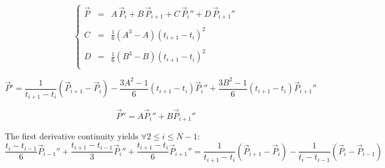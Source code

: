 \documentclass[aps,12pt]{revtex4}
\begin{document}
\begin{equation}
\left\lbrace
\begin{array}{rcl}
	\vec{P}   & = & A \, \vec{P}_i + B \, \vec{P}_{i+1} + C \, \vec{P}_i'' + D \, \vec{P}_{i+1}''\\
	\\
	C & = & \frac{1}{6} \left(A^3 - A\right) (t_{i+1}-t_i)^2\\
	\\
	D & = & \frac{1}{6} \left(B^3 - B\right) (t_{i+1}-t_i)^2\\
\end{array}
\right.
\end{equation}

\begin{equation}
	\vec{P}' = \dfrac{1}{t_{i+1}-t_i} \left(\vec{P}_{i+1}-\vec{P}_i\right) 
	- \dfrac{3A^2-1}{6} (t_{i+1}-t_i) \vec{P}_i''
	+ \dfrac{3B^2-1}{6} (t_{i+1}-t_i) \vec{P}_{i+1}''
\end{equation}	


\begin{equation}
	\vec{P}'' = A \vec{P}_i'' + B \vec{P}_{i+1}''
\end{equation}

The first derivative continuity yields $\forall 2\leq i \leq N-1$:
\begin{equation}
 	\dfrac{t_{i}-t_{i-1}}{6} \vec{P}_{i-1}'' + 
	\dfrac{t_{i+1}-t_{i-1}}{3} \vec{P}_i''
	+\dfrac{t_{i+1}-t_{i}}{6} \vec{P}_{i+1}''  = 
	\dfrac{1}{t_{i+1}-t_i} \left( \vec{P}_{i+1} - \vec{P}_{i} \right) -
	\dfrac{1}{t_{i}-t_{i-1}} \left( \vec{P}_i - \vec{P}_{i-1} \right) 
\end{equation}
\end{document}

